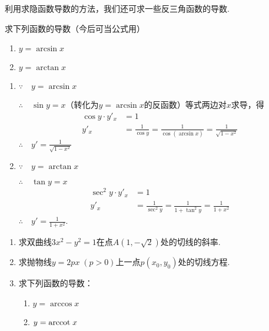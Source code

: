 利用求隐函数导数的方法，我们还可求一些反三角函数的导数.

\begin{example}
求下列函数的导数（今后可当公式用）
\begin{multicols}{2}
\begin{enumerate}[(1)]
    \item $y=\arcsin x$
    \item $y=\arctan x$
\end{enumerate}
\end{multicols}
\end{example}

\begin{solution}
\begin{enumerate}[(1)]
    \item $\because\quad y=\arcsin x$

$\therefore\quad \sin y=x$（转化为$y=\arcsin x$的反函数）等式两边对$x$求导，得
\[\begin{split}
    \cos y\cdot y'_x&=1\\
y'_x&=\frac{1}{\cos y}=\frac{1}{\cos(\arcsin x)}=\frac{1}{\sqrt{1-x^2}}
\end{split}\]
$\therefore\quad y'=\frac{1}{\sqrt{1-x^2}}$

\item $\because\quad y=\arctan x$

$\therefore\quad \tan y=x$
\[\begin{split}
     \sec^2 y\cdot y'_x&=1\\
     y'_x&=\frac{1}{\sec^2 y}=\frac{1}{1+\tan^2 y}=\frac{1}{1+x^2}
\end{split}\]
$\therefore\quad y'=\frac{1}{1+x^2}$.
\end{enumerate}    
\end{solution}

\begin{ex}
\begin{enumerate}
    \item 求双曲线$3x^2-y^2=1$在点$A(1,-\sqrt{2})$处的切线的斜率.
    \item 求抛物线$y=2px\; (p>0)$上一点$p(x_0,y_0)$处的切线方程.
    \item 求下列函数的导数：
\begin{multicols}{2}
\begin{enumerate}[(1)]
    \item $y=\arccos x$
    \item $y={\rm arccot\;} x$
\end{enumerate}
\end{multicols}
\end{enumerate}
\end{ex}


